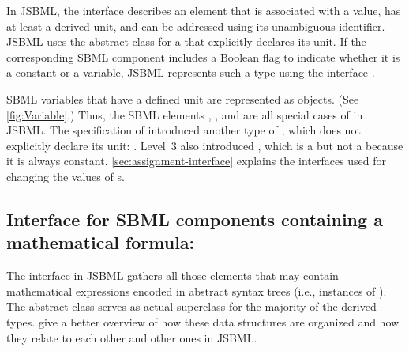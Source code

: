 In JSBML, the interface \Quantity describes an element that is associated
with a value, has at least a derived unit, and can be addressed using its
unambiguous identifier. JSBML uses the abstract class \QuantityWithUnit for
a \Quantity that explicitly declares its unit.  If the corresponding SBML
component includes a Boolean  flag to indicate whether it is
a constant  or a variable, JSBML
represents such a type using the interface \Variable.

SBML variables  that have a defined unit are
represented as \Symbol objects.  (See \vref{fig:Variable}.) Thus,
the SBML elements \Compartment, \Parameter, and \Species are all special
cases of \Symbol in JSBML.  The specification of \SBMLthree introduced
another type of \Variable, which does not explicitly declare its unit:
\SpeciesReference.  Level~3 also introduced \LocalParameter, which is a
\QuantityWithUnit but not a \Variable because it is always constant.
\vref{sec:assignment-interface} explains the interfaces used for
changing the values of \Variable{}s.


\subsection{Interface for SBML components containing a mathematical
  formula: } 

The interface \MathContainer in JSBML gathers all those elements that may
contain mathematical expressions encoded in abstract syntax trees (i.e.,
instances of \ASTNode).  The abstract class \AbstractMathContainer serves
as actual superclass for the majority of the derived types.
 give a
better overview of how these data structures are organized and how they
relate to each other and other ones in JSBML.

